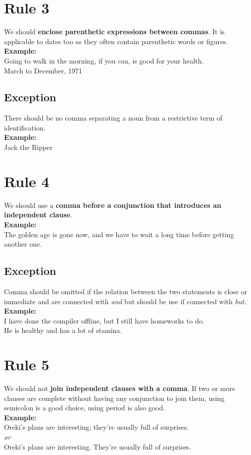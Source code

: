 \documentclass[12pt]{report}
\begin{document}
\section{Rule 3}
We should \textbf{enclose parenthetic expressions between commas}. It is applicable to dates too as they often contain parenthetic words or figures.\\
\textbf{Example:}\\
Going to walk in the morning, if you can, is good for your health.\\
March to December, 1971\\

\subsection{Exception}
There should be no comma separating a noun from a restrictive term of identification.\\
\textbf{Example:}\\
Jack the Ripper


\section{Rule 4}
We should use a \textbf{comma before a conjunction that introduces an independent clause}.\\ \textbf{Example:}\\
The golden age is gone now, and we have to wait a long time before getting another one.

\subsection{Exception}
Comma should be omitted if the relation between the two statements is close or immediate and are connected with \textit{and} but should be use if connected with \textit{but}.\\
\textbf{Example:}\\
I have done the compiler offline, but I still have homeworks to do.\\
He is healthy and has a lot of stamina.


\section{Rule 5}
We should not \textbf{join independent clauses with a comma}. If two or more clauses are complete without having any conjunction to join them, using semicolon is a good choice, using period is also good.\\
\textbf{Example:}\\
Oreki's plans are interesting; they're usually full of surprises.\\
\textit{or}\\
Oreki's plans are interesting. They're usually full of surprises.
\end{document}
